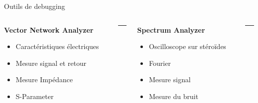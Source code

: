 \begin{frame}[t]{Outils de debugging}
    \vspace{-8pt}
    \begin{columns}[T]
        \begin{column}{0.33\textwidth}
            \vspace{-12pt}
            \begin{center}
                \textbf{Vector Network Analyzer}
            \end{center}
            \begin{itemize}
                \item Caractéristiques électriques
                \item Mesure signal et retour
                \bigskip
                \item Mesure Impédance
                \item S-Parameter
            \end{itemize}
        \end{column}
        \begin{column}{0.001\textwidth}
            \rule{0.1mm}{0.85\textheight}
        \end{column}

        \begin{column}{0.33\textwidth}
            \vspace{-12pt}
            \begin{center}
                \textbf{Spectrum Analyzer}
            \end{center}
            \begin{itemize}
                \item Oscilloscope sur stéroïdes
                \item Fourier
                \bigskip
                \item Mesure signal
                \item Mesure du bruit
            \end{itemize}
        \end{column}
        \begin{column}{0.001\textwidth}
            \rule{0.1mm}{0.85\textheight}
        \end{column}


\end{columns}
\end{frame}
